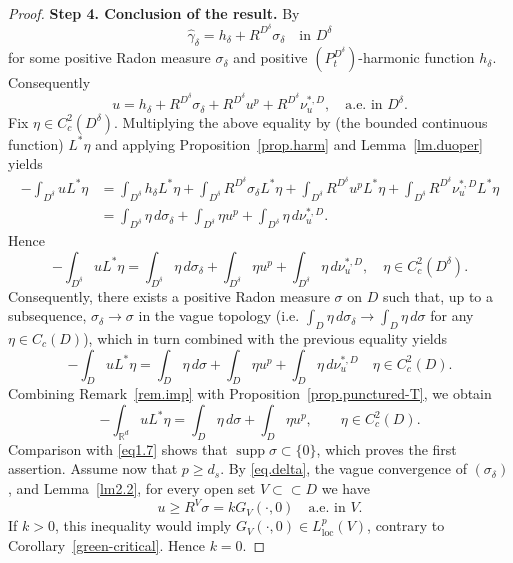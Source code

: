 \documentclass[11pt,a4paper,reqno]{amsart}
\theoremstyle{definition}
\numberwithin{equation}{section}
\begin{document}
\begin{proof}
\medskip 
\noindent 
\textbf{Step 4. Conclusion of the result.} 
By \cite[Theorem VI.2.11]{BG}
\[
\hat\gamma_\delta=h_\delta+R^{D^\delta}\sigma_\delta\quad\text{in }D^\delta
\]
for some positive Radon  measure $\sigma_\delta$ and positive $(P^{D^\delta}_t)$-harmonic function $h_\delta$.
Consequently
\begin{equation}
\label{eq.delta}
 u=h_\delta+R^{D^\delta}\sigma_\delta+R^{D^\delta}u^p+R^{D^\delta}\nu^{*,D}_{u},\quad \text{a.e. in }D^\delta.
\end{equation}
Fix  $\eta\in C_c^2(D^\delta)$. Multiplying the above equality by (the bounded continuous function) $L^*\eta$ 
and applying Proposition~\ref{prop.harm} and Lemma~\ref{lm.duoper} yields
\[
\begin{split}
-\int_{D^\delta}uL^*\eta&=\int_{D^\delta}h_\delta L^*\eta+\int_{D^\delta} R^{D^\delta}\sigma_\delta L^*\eta+
\int_{D^\delta} R^{D^\delta}u^p L^*\eta+\int_{D^\delta} R^{D^\delta}\nu^{*,D}_{u} L^*\eta
\\&=\int_{D^\delta}\eta\,d\sigma_\delta+\int_{D^\delta}\eta u^p+\int_{D^\delta}\eta\,d\nu^{*,D}_{u}.
\end{split}
\]
Hence
\[
-\int_{D^\delta}uL^*\eta=\int_{D^\delta}\eta\,d\sigma_\delta+\int_{D^\delta}\eta u^p+\int_{D^\delta}\eta\,d\nu^{*,D}_{u},\quad \eta\in C_c^2(D^\delta).
\]
Consequently, there exists a positive Radon measure $\sigma$ on $D$ such that, up to a subsequence, $\sigma_\delta\to \sigma$
in the vague topology (i.e. $\int_{D}\eta\,d\sigma_{\delta}\to \int_D\eta\,d\sigma$ for any $\eta\in C_c(D)$), which in turn 
combined with the previous equality yields
\[
-\int_{D} uL^*\eta=\int_{D}\eta\,d\sigma+\int_{D}\eta u^p+\int_{D}\eta\,d\nu^{*,D}_{u}\quad \eta\in C_c^2(D).
\]
Combining Remark~\ref{rem.imp} with Proposition~\ref{prop.punctured-T}, we obtain 
\[
-\int_{\mathbb R^d}uL^*\eta = \int_D\eta\,d\sigma+\int_D\eta u^p, \qquad \eta\in C_c^2(D).
\]
Comparison with \eqref{eq1.7} shows that \(\operatorname{supp}\sigma\subset\{0\}\), 
which proves the first assertion. Assume now that \(p\geq d_s\). By \eqref{eq.delta}, 
the vague convergence of \((\sigma_\delta)\), and Lemma~\ref{lm2.2}, for every open set \(V\subset\subset D\) 
we have
\[
u\geq R^V\sigma=kG_V(\cdot,0) \quad\text{a.e. in }V. 
\]
If \(k>0\), this inequality would imply 
\(G_V(\cdot,0)\in L^p_{\mathrm{loc}}(V)\), contrary to Corollary~\ref{green-critical}. Hence \(k=0\).
\end{proof}
\end{document}
